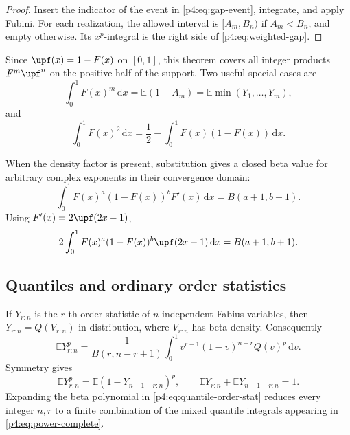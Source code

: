 \documentclass[11pt,oneside]{article}
\theoremstyle{definition}
\theoremstyle{remark}
\newcommand{\F}{F}
\newcommand{\Q}{Q}
\newcommand{\E}{\mathbb E}
\newcommand{\dd}{\,\mathrm d}
\newcommand{\1}{\mathbf 1}
\begin{document}
\begin{proof}
Insert the indicator of the event in \cref{p4:eq:gap-event}, integrate, and apply Fubini.
For each realization, the allowed interval is \([A_m,B_n)\) if \(A_m<B_n\), and empty
otherwise.  Its \(x^p\)-integral is the right side of \cref{p4:eq:weighted-gap}.
\end{proof}

Since \(\upf(x)=1-\F(x)\) on \([0,1]\), this theorem covers all integer products
\(\F^m\upf^n\) on the positive half of the support.  Two useful special cases are
\begin{equation}\label{p4:eq:Fm-order}
 \int_0^1\F(x)^m\dd x=\E(1-A_m)=\E\min(Y_1,\ldots,Y_m),
\end{equation}
and
\begin{equation}\label{p4:eq:F2-gini-relation}
 \int_0^1\F(x)^2\dd x
 =\frac12-\int_0^1\F(x)(1-\F(x))\dd x.
\end{equation}

When the density factor is present, substitution gives a closed beta value for arbitrary
complex exponents in their convergence domain:
\begin{equation}\label{p4:eq:density-beta}
 \int_0^1\F(x)^a(1-\F(x))^b\F'(x)\dd x
 =B(a+1,b+1).
\end{equation}
Using \(\F'(x)=2\upf(2x-1)\),
\begin{equation}\label{p4:eq:up-density-beta}
 2\int_0^1\F(x)^a(1-\F(x))^b\upf(2x-1)\dd x
 =B(a+1,b+1).
\end{equation}

\subsection{Quantiles and ordinary order statistics}

If \(Y_{r:n}\) is the \(r\)-th order statistic of \(n\) independent Fabius variables,
then \(Y_{r:n}=\Q(V_{r:n})\) in distribution, where \(V_{r:n}\) has beta density.
Consequently
\begin{equation}\label{p4:eq:quantile-order-stat}
 \E Y_{r:n}^p
 =\frac1{B(r,n-r+1)}
 \int_0^1v^{r-1}(1-v)^{n-r}\Q(v)^p\dd v.
\end{equation}
Symmetry gives
\begin{equation}\label{p4:eq:order-stat-symmetry}
 \E Y_{r:n}^p
 =\E(1-Y_{n+1-r:n})^p,
 \qquad
 \E Y_{r:n}+\E Y_{n+1-r:n}=1.
\end{equation}
Expanding the beta polynomial in \cref{p4:eq:quantile-order-stat} reduces every integer
\(n,r\) to a finite combination of the mixed quantile integrals appearing in
\cref{p4:eq:power-complete}.
\end{document}
